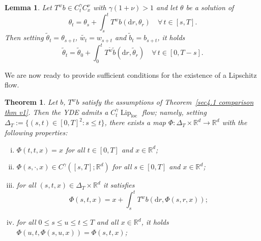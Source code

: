 \documentclass[10pt]{article}
\newcommand{\assign}{:=}
\newcommand{\mathd}{\mathrm{d}}
\newcommand{\tmop}[1]{\ensuremath{\operatorname{#1}}}
\newenvironment{enumerateroman}{\begin{enumerate}[i.] }{\end{enumerate}}
\newtheorem{lemma}{Lemma}
\newtheorem{theorem}{Theorem}
\begin{document}
\begin{lemma}
  \label{sec4.3 lemma translated YDE}Let $T^w b \in C^{\gamma}_t C^{\nu}_x$
  with $\gamma (1 + \nu) > 1$ and let $\theta$ be a solution of
  \[ \theta_t = \theta_s + \int_s^t T^w b (\mathd r, \theta_r) \quad \forall
     \, t \in [s, T] . \]
  Then setting $\tilde{\theta}_t = \theta_{s + t}$, $\widetilde{w_t} = w_{s +
  t}$ and $\tilde{b}_t = b_{s + t}$, it holds
  \[ \tilde{\theta}_t = \tilde{\theta}_0 + \int_0^t T^{\tilde{w}} \tilde{b}
     (\mathd r, \tilde{\theta}_r) \quad \forall \, t \in [0, T - s] . \]
\end{lemma}

We are now ready to provide sufficient conditions for the existence of a
Lipschitz flow.

\begin{theorem}
  \label{sec4.3 theorem existence flow}Let $b$, $T^w b$ satisfy the
  assumptions of Theorem~\ref{sec4.1 comparison thm v1}. Then the YDE admits a
  $C^{\gamma}_t \tmop{Lip}_{\tmop{loc}}$ flow; namely, setting $\Delta_T
  \assign \{ (s, t) \in [0, T]^2 : s \leqslant t \}$, there exists a map $\Phi
  : \Delta_T \times \mathbb{R}^d \rightarrow \mathbb{R}^d$ with the following
  properties:
  \begin{enumerateroman}
    \item $\Phi (t, t, x) = x$ for all $t \in [0, T]$ and $x \in
    \mathbb{R}^d$;
    
    \item $\Phi (s, \cdot, x) \in C^{\gamma} ([s, T] ; \mathbb{R}^d)$ for all
    $s \in [0, T]$ and $x \in \mathbb{R}^d$;
    
    \item for all $(s, t, x) \in \Delta_T \times \mathbb{R}^d$ it satisfies
    \[ \Phi (s, t, x) = x + \int_s^t T^w b (\mathd r, \Phi (s, r, x)) ; \]
    \item for all $0 \leqslant s \leqslant u \leqslant t \leqslant T$ and all
    $x \in \mathbb{R}^d$, it holds $\Phi (u, t, \Phi (s, u, x)) = \Phi (s, t,
    x)$;
    

\end{enumerateroman}
\end{theorem}
\end{document}
